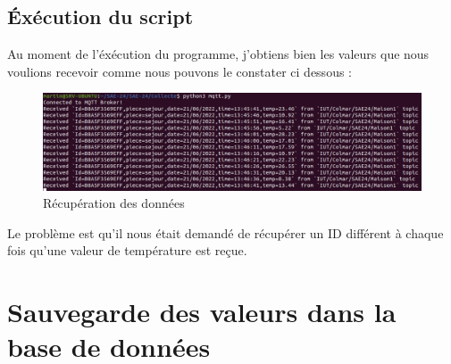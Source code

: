 \documentclass[12pt, a4paper]{article}
\begin{document}
		\subsection{Éxécution du script}
		Au moment de l'éxécution du programme, j'obtiens bien les valeurs que 
		nous voulions recevoir comme nous pouvons le constater ci dessous :
		\begin{figure}[H]
			\centering
			\includegraphics[width=1\textwidth]{../img/recup.png}
			\caption{Récupération des données}
			\label{fig:recup}
		\end{figure}
		Le problème est qu'il nous était demandé de récupérer un ID différent
		à chaque fois qu'une valeur de température est reçue.

	\section{Sauvegarde des valeurs dans la base de données}
\end{document}
